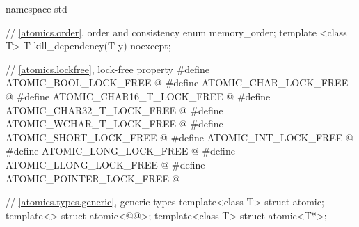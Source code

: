 %
%
\begin{codeblock}
namespace std {
  // \ref{atomics.order}, order and consistency
  enum memory_order;
  template <class T>
    T kill_dependency(T y) noexcept;

  // \ref{atomics.lockfree}, lock-free property
  #define ATOMIC_BOOL_LOCK_FREE @\unspec@
  #define ATOMIC_CHAR_LOCK_FREE @\unspec@
  #define ATOMIC_CHAR16_T_LOCK_FREE @\unspec@
  #define ATOMIC_CHAR32_T_LOCK_FREE @\unspec@
  #define ATOMIC_WCHAR_T_LOCK_FREE @\unspec@
  #define ATOMIC_SHORT_LOCK_FREE @\unspec@
  #define ATOMIC_INT_LOCK_FREE @\unspec@
  #define ATOMIC_LONG_LOCK_FREE @\unspec@
  #define ATOMIC_LLONG_LOCK_FREE @\unspec@
  #define ATOMIC_POINTER_LOCK_FREE @\unspec@

  // \ref{atomics.types.generic}, generic types
  template<class T> struct atomic;
  template<> struct atomic<@@>;
  template<class T> struct atomic<T*>;

}
\end{codeblock}

